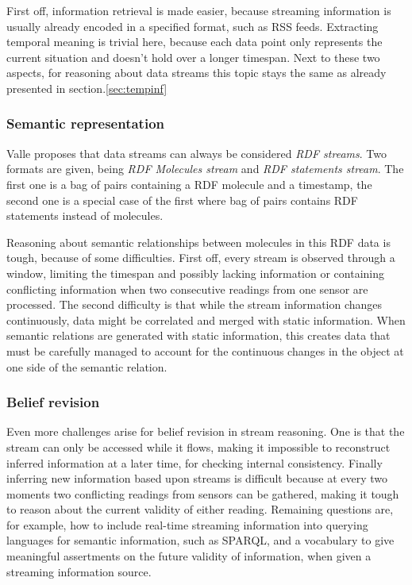 \documentclass{llncs}
\begin{document}
First off, information retrieval is made easier, because streaming information is usually already encoded in a specified format, such as RSS feeds. Extracting temporal meaning is trivial here, because each data point only represents the current situation and doesn't hold over a longer timespan. Next to these two aspects, for reasoning about data streams this topic stays the same as already presented in section.\ref{sec:tempinf}


\subsubsection{Semantic representation}
Valle proposes that data streams can always be considered \emph{RDF streams}. Two formats are given, being \emph{RDF Molecules stream} and \emph{RDF statements stream}. The first one is a bag of pairs containing a RDF molecule and a timestamp, the second one is a special case of the first where bag of pairs contains RDF statements instead of molecules.

Reasoning about semantic relationships between molecules in this RDF data is tough, because of some difficulties.\cite{Valle2009} First off, every stream is observed through a window, limiting the timespan and possibly lacking information or containing conflicting information when two consecutive readings from one sensor are processed. The second difficulty is that while the stream information changes continuously, data might be correlated and merged with static information. When semantic relations are generated with static information, this creates data that must be carefully managed to account for the continuous changes in the object at one side of the semantic relation.


\subsubsection{Belief revision}
Even more challenges arise for belief revision in stream reasoning. One is that the stream can only be accessed while it flows, making it impossible to reconstruct inferred information at a later time, for checking internal consistency. Finally inferring new information based upon streams is difficult because at every two moments two conflicting readings from sensors can be gathered, making it tough to reason about the current validity of either reading. Remaining questions are, for example, how to include real-time streaming information into querying languages for semantic information, such as SPARQL, and a vocabulary to give meaningful assertments on the future validity of information, when given a streaming information source.
\end{document}
